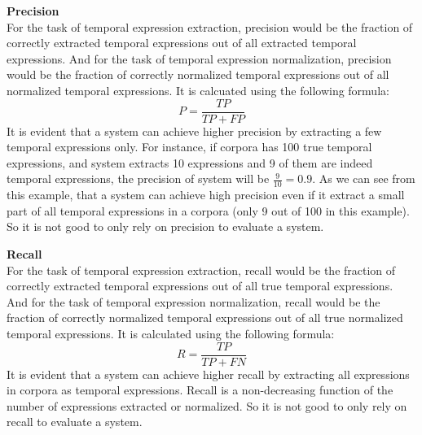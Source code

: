 \textbf{Precision}\\
For the task of temporal expression extraction, precision would be the fraction of correctly extracted temporal expressions out of all extracted temporal expressions. And for the task of temporal expression normalization, precision would be the fraction of correctly normalized temporal expressions out of all normalized temporal expressions. It is calcuated using the following formula:
$$P = \frac{TP}{TP+FP}$$
It is evident that a system can achieve higher precision by extracting a few temporal expressions only. For instance, if corpora has 100 true temporal expressions, and system extracts 10 expressions and 9 of them are indeed temporal expressions, the precision of system will be $\frac{9}{10} = 0.9$. As we can see from this example, that a system can achieve high precision even if it extract a small part of all temporal expressions in a corpora (only 9 out of 100 in this example). So it is not good to only rely on precision to evaluate a system. 

\textbf{Recall}\\
For the task of temporal expression extraction, recall would be the fraction of correctly extracted temporal expressions out of all true temporal expressions. And for the task of temporal expression normalization, recall would be the fraction of correctly normalized temporal expressions out of all true normalized temporal expressions. It is calculated using the following formula:
$$R = \frac{TP}{TP+FN}$$
It is evident that a system can achieve higher recall by extracting all expressions in corpora as temporal expressions. Recall is a non-decreasing function of the number of expressions extracted or normalized. So it is not good to only rely on recall to evaluate a system. 


